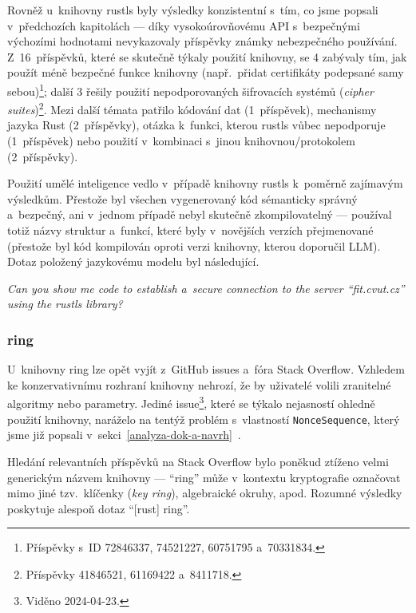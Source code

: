 Rovněž u~knihovny rustls byly výsledky konzistentní s~tím, co jsme popsali v~předchozích kapitolách --- díky vysokoúrovňovému API s~bezpečnými výchozími hodnotami nevykazovaly příspěvky známky nebezpečného používání. Z~16~příspěvků, které se skutečně týkaly použití knihovny, se 4 zabývaly tím, jak použít méně bezpečné funkce knihovny (např.\ přidat certifikáty podepsané samy sebou)\footnote{Příspěvky s~ID 72846337, 74521227, 60751795 a~70331834.}; další 3 řešily použití nepodporovaných šifrovacích systémů (\textit{cipher suites})\footnote{Příspěvky 41846521, 61169422 a~8411718.}. Mezi další témata patřilo  kódování dat (1~příspěvek), mechanismy jazyka Rust (2~příspěvky), otázka k~funkci, kterou rustls vůbec nepodporuje (1~příspěvek) nebo použití v~kombinaci s~jinou knihovnou/protokolem (2~příspěvky).

Použití umělé inteligence vedlo v~případě knihovny rustls k~poměrně zajímavým výsledkům. Přestože byl všechen vygenerovaný kód sémanticky správný a~bezpečný, ani v~jednom případě nebyl skutečně zkompilovatelný --- používal totiž názvy struktur a~funkcí, které byly v~novějších verzích přejmenované (přestože byl kód kompilován oproti verzi knihovny, kterou doporučil LLM). Dotaz položený jazykovému modelu byl následující.

\begin{displayquote}
\textit{Can you show me code to establish a~secure connection to the server ``fit.cvut.cz'' using the rustls library?}
\end{displayquote}

\subsubsection*{ring}

U~knihovny ring lze opět vyjít z~GitHub issues a~fóra Stack Overflow. Vzhledem ke konzervativnímu rozhraní knihovny nehrozí, že by uživatelé volili zranitelné algoritmy nebo parametry. Jediné issue\footnote{Viděno 2024-04-23.}, které se týkalo nejasností ohledně použití knihovny, naráželo na tentýž problém s~vlastností \texttt{NonceSequence}, který jsme již popsali v~sekci~\ref{analyza-dok-a-navrh}~\cite{ring-issue}.

Hledání relevantních příspěvků na Stack Overflow bylo poněkud ztíženo velmi generickým názvem knihovny --- ``ring'' může v~kontextu kryptografie označovat mimo jiné tzv.~klíčenky (\textit{key ring}), algebraické okruhy, apod. Rozumné výsledky poskytuje alespoň dotaz ``[rust] ring''.

